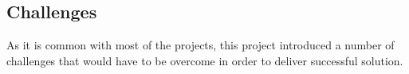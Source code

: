 \subsection{Challenges}
As it is common with most of the projects, this project introduced a number of challenges that would have to be overcome in order to deliver successful solution. 